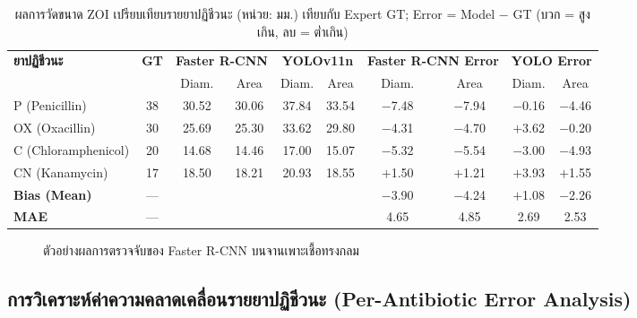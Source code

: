 \begin{table}[H]
  \centering
  \caption{ผลการวัดขนาด ZOI เปรียบเทียบรายยาปฏิชีวนะ (หน่วย: มม.) เทียบกับ Expert GT; Error = Model $-$ GT (บวก = สูงเกิน, ลบ = ต่ำเกิน)}
  \label{tab:model_comparison}
  \renewcommand{\arraystretch}{1.15}
  \begin{tabular}{lccccccccc}
    \toprule
    \multirow{2}{*}{\textbf{ยาปฏิชีวนะ}} &
    \multirow{2}{*}{\textbf{GT}} &
    \multicolumn{2}{c}{\textbf{Faster R-CNN}} &
    \multicolumn{2}{c}{\textbf{YOLOv11n}} &
    \multicolumn{2}{c}{\textbf{Faster R-CNN Error}} &
    \multicolumn{2}{c}{\textbf{YOLO Error}} \\
    \cmidrule(lr){3-4}\cmidrule(lr){5-6}\cmidrule(lr){7-8}\cmidrule(lr){9-10}
    & & Diam. & Area & Diam. & Area & Diam. & Area & Diam. & Area \\
    \midrule
    P  (Penicillin)       & 38 & 30.52 & 30.06 & 37.84 & 33.54 & $-$7.48 & $-$7.94 & $-$0.16 & $-$4.46 \\
    OX (Oxacillin)        & 30 & 25.69 & 25.30 & 33.62 & 29.80 & $-$4.31 & $-$4.70 & $+$3.62 & $-$0.20 \\
    C  (Chloramphenicol)  & 20 & 14.68 & 14.46 & 17.00 & 15.07 & $-$5.32 & $-$5.54 & $-$3.00 & $-$4.93 \\
    CN (Kanamycin)        & 17 & 18.50 & 18.21 & 20.93 & 18.55 & $+$1.50 & $+$1.21 & $+$3.93 & $+$1.55 \\
    \midrule
    \textbf{Bias (Mean)}  & --- & \multicolumn{2}{c}{} & \multicolumn{2}{c}{} &
                            $-$3.90 & $-$4.24 &
                            $+$1.08 & $-$2.26 \\
    \textbf{MAE}          & --- & \multicolumn{2}{c}{} & \multicolumn{2}{c}{} &
                            4.65 & 4.85 &
                            2.69 & 2.53 \\
    \bottomrule
  \end{tabular}
\end{table}

\begin{figure}[H]
  \centering
  \caption{ตัวอย่างผลการตรวจจับของ Faster R-CNN บนจานเพาะเชื้อทรงกลม}
  \label{fig:frcnn_result}
\end{figure}

\subsection{การวิเคราะห์ค่าความคลาดเคลื่อนรายยาปฏิชีวนะ (Per-Antibiotic Error Analysis)}

